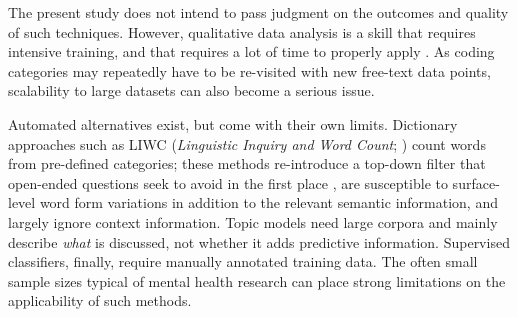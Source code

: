 \documentclass[man,floatsintext]{apa7}
\newcommand{\change}[1]{#1}
\begin{document}
The present study does not intend to pass judgment on the outcomes and quality of such techniques. However, qualitative data analysis is a skill that requires intensive training, and that requires a lot of time to properly apply \parencite{braun2006using,oconnor2020intercoder}. As coding categories may repeatedly have to be re-visited with new free-text data points, scalability to large datasets can also become a serious issue. 

\change{Automated alternatives exist, but come with their own limits. Dictionary approaches such as LIWC (\emph{Linguistic Inquiry and Word Count}; \cite{tausczik2010psychological,boyd2021natural}) count words from pre-defined categories; these methods re-introduce a top-down filter that open-ended questions seek to avoid in the first place \parencite{schwartz2013personality}, are susceptible to surface-level word form variations in addition to the relevant semantic information, and largely ignore context information. Topic models \parencite{Blei2003,roberts2014structural} need large corpora and mainly describe \emph{what} is discussed, not whether it adds predictive information. Supervised classifiers, finally, require manually annotated training data. The often small sample sizes typical of \change{mental health research} can place strong limitations on the applicability of such methods.}
\end{document}
